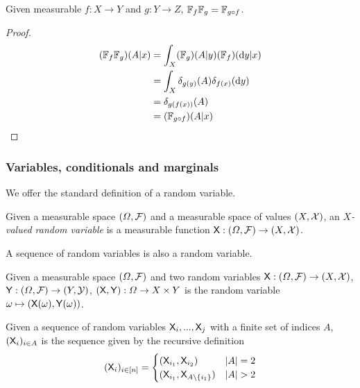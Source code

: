 \begin{lemma}\label{lem:func_kern_product}
Given measurable $f:X\to Y$ and $g:Y\to Z$, $\mathbb{F}_f\mathbb{F}_g = \mathbb{F}_{g\circ f}$.
\end{lemma}

\begin{proof}
\begin{align}
    (\mathbb{F}_{f}\mathbb{F}_g)(A|x) &= \int_X (\mathbb{F}_g)(A|y) (\mathbb{F}_f)(\mathrm{d}y|x)\\
                                      &= \int_X \delta_{g(y)}(A) \delta_{f(x)}(\mathrm{d}y)\\
                                      &= \delta_{g(f(x))} (A)\\
                                      &= (\mathbb{F}_{g\circ f})(A|x) 
\end{align}
\end{proof}

\subsubsection{Variables, conditionals and marginals}

We offer the standard definition of a random variable.

\begin{definition}\label{def:variable}
Given a measurable space $(\Omega,\mathcal{F})$ and a measurable space of values $(X,\mathcal{X})$, an \emph{$X$-valued random variable} is a measurable function $\mathsf{X}:(\Omega,\mathcal{F})\to (X,\mathcal{X})$.
\end{definition}

A sequence of random variables is also a random variable.

\begin{definition}\label{def:seqvar}
Given a measurable space $(\Omega,\mathcal{F})$ and two random variables $\mathsf{X}:(\Omega,\mathcal{F})\to (X,\mathcal{X})$, $\mathsf{Y}:(\Omega,\mathcal{F})\to (Y,\mathcal{Y})$, $(\mathsf{X},\mathsf{Y}):\Omega\to X\times Y$ is the random variable $\omega\mapsto (\mathsf{X}(\omega),\mathsf{Y}(\omega))$.

Given a sequence of random variables $\mathsf{X}_i,...,\mathsf{X}_j$ with a finite set of indices $A$, $(\mathsf{X}_i)_{i\in A}$ is the sequence given by the recursive definition
\begin{align}
	(\RV{X}_i)_{i\in [n]} = \begin{cases}
	(\RV{X}_{i_1},\RV{X}_{i_2}) & |A|=2\\
	(\RV{X}_{i_1},\RV{X}_{A\setminus \{i_1\}}) & |A|>2
	\end{cases}
\end{align}
\end{definition}


